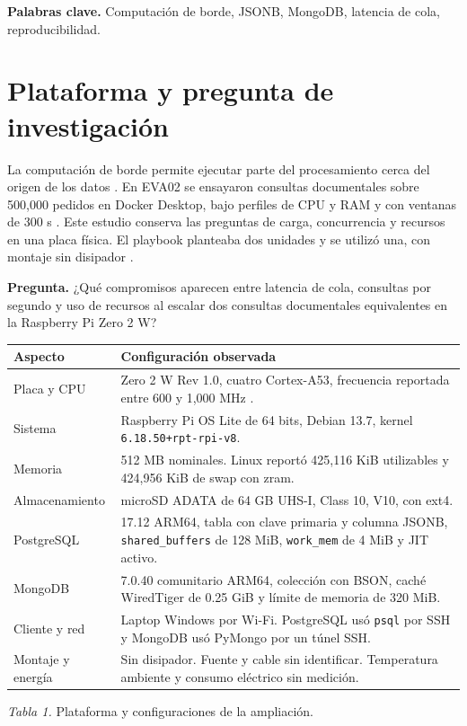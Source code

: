\documentclass[10pt,a4paper]{article}
\newcommand{\clave}[1]{\texttt{#1}}
\begin{document}
\textbf{Palabras clave.} Computación de borde, JSONB, MongoDB, latencia de cola, reproducibilidad.
\tableofcontents

\clearpage
\section{Plataforma y pregunta de investigación}
La computación de borde permite ejecutar parte del procesamiento cerca del origen de los datos \cite{nist}. En EVA02 se ensayaron consultas documentales sobre 500,000 pedidos en Docker Desktop, bajo perfiles de CPU y RAM y con ventanas de 300 s \cite{eva02}. Este estudio conserva las preguntas de carga, concurrencia y recursos en una placa física. El playbook planteaba dos unidades y se utilizó una, con montaje sin disipador \cite{playbook}.

\textbf{Pregunta.} ¿Qué compromisos aparecen entre latencia de cola, consultas por segundo y uso de recursos al escalar dos consultas documentales equivalentes en la Raspberry Pi Zero 2 W?

\begin{center}
\small
\begin{tabularx}{.98\linewidth}{@{}lX@{}}
\toprule Aspecto & Configuración observada\\
\midrule
Placa y CPU & Zero 2 W Rev 1.0, cuatro Cortex-A53, frecuencia reportada entre 600 y 1,000 MHz \cite{pi,arm}.\\
Sistema & Raspberry Pi OS Lite de 64 bits, Debian 13.7, kernel \clave{6.18.50+rpt-rpi-v8}.\\
Memoria & 512 MB nominales. Linux reportó 425,116 KiB utilizables y 424,956 KiB de swap con zram.\\
Almacenamiento & microSD ADATA de 64 GB UHS-I, Class 10, V10, con ext4.\\
PostgreSQL & 17.12 ARM64, tabla con clave primaria y columna JSONB, \clave{shared\_buffers} de 128 MiB, \clave{work\_mem} de 4 MiB y JIT activo.\\
MongoDB & 7.0.40 comunitario ARM64, colección con BSON, caché WiredTiger de 0.25 GiB y límite de memoria de 320 MiB.\\
Cliente y red & Laptop Windows por Wi-Fi. PostgreSQL usó \clave{psql} por SSH y MongoDB usó PyMongo por un túnel SSH.\\
Montaje y energía & Sin disipador. Fuente y cable sin identificar. Temperatura ambiente y consumo eléctrico sin medición.\\
\bottomrule
\end{tabularx}
\par\smallskip\textit{Tabla 1.} Plataforma y configuraciones de la ampliación.
\end{center}
\end{document}
